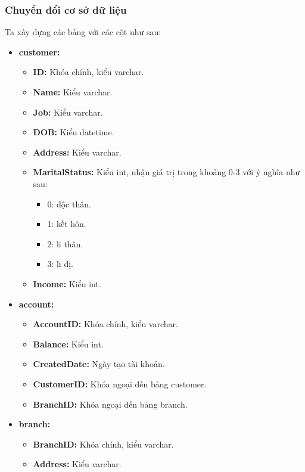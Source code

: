 \documentclass{article}
\begin{document}
\subsubsection{Chuyển đổi cơ sở dữ liệu}
Ta xây dựng các bảng với các cột như sau:
\begin{itemize}
    \item \textbf{customer:}
    \begin{itemize}
        \item \textbf{ID:} Khóa chính, kiểu varchar.
        \item \textbf{Name:} Kiểu varchar. 
        \item \textbf{Job:} Kiểu varchar.
        \item \textbf{DOB:} Kiểu datetime.
        \item \textbf{Address:} Kiểu varchar. 
        \item \textbf{MaritalStatus:} Kiểu int, nhận giá trị trong khoảng 0-3 với ý nghĩa như sau:
        \begin{itemize}
            \item 0: độc thân.
            \item 1: kết hôn.
            \item 2: li thân.
            \item 3: li dị. 
        \end{itemize}
        \item \textbf{Income:} Kiểu int.
        
    \end{itemize}
    \item \textbf{account:}
    \begin{itemize}
        \item \textbf{AccountID:} Khóa chính, kiểu varchar.
        \item \textbf{Balance:} Kiểu int.
        \item \textbf{CreatedDate:} Ngày tạo tài khoản.
        \item \textbf{CustomerID:} Khóa ngoại đến bảng customer.
        \item \textbf{BranchID:} Khóa ngoại đến bảng branch.
    \end{itemize}
    
    \item \textbf{branch:}
    \begin{itemize}
        \item \textbf{BranchID:} Khóa chính, kiểu varchar.
        \item \textbf{Address:} Kiểu varchar.
    \end{itemize}
        

\end{itemize}
\end{document}
